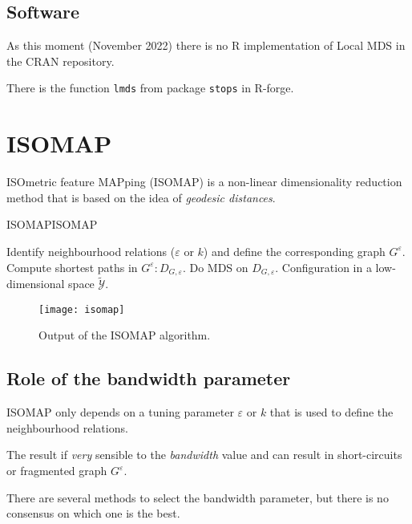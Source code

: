 \subsection{Software}

As this moment (November 2022) there is no R implementation of Local MDS
in the CRAN repository.

There is the function \texttt{lmds} from package \texttt{stops} in R-forge.


\pagebreak
\section{ISOMAP}

ISOmetric feature MAPping (ISOMAP) is a non-linear dimensionality reduction
method that is based on the idea of \emph{geodesic distances}.

\begin{algorithm}{ISOMAP}{ISOMAP}
	\begin{algorithmic}[1]
		 
		\State Identify neighbourhood relations ($\varepsilon$ or $k$) and define the
		corresponding graph $G^\varepsilon$.
		\State Compute shortest paths in $G^\varepsilon: D_{G,\varepsilon}$.
		\State Do MDS on $D_{G,\varepsilon}$.
		\State \Return Configuration in a low-dimensional space $\mathcal{\tilde{Y}}$.
		\EndProcedure
	\end{algorithmic}
\end{algorithm}

\begin{figure}[H]
	\texttt{[image: isomap]}
	\caption{Output of the ISOMAP algorithm.}
\end{figure}

\subsection{Role of the bandwidth parameter}
ISOMAP only depends on a tuning parameter $\varepsilon$ or $k$ that is used to
define the neighbourhood relations.

\begin{marker}
    The result if \emph{very} sensible to the \emph{bandwidth} value and can result
	in short-circuits or fragmented graph $G^\varepsilon$.
\end{marker}

There are several methods to select the bandwidth parameter, but there
is no consensus on which one is the best.

